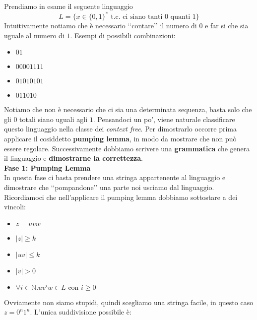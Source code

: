 \documentclass[a4paper,oneside]{scrbook}
\begin{document}
Prendiamo in esame il seguente linguaggio 
$$L=\{x\in\{0,1\}^*\text{ t.c. ci siano tanti 0 quanti 1}\}$$
Intuitivamente notiamo che è necessario ‘‘contare’’ il numero di $0$ e far si che sia uguale al numero di $1$. Esempi di possibili combinazioni:
\begin{itemize}
	\item $01$
	\item $00001111$
	\item $01010101$
	\item $011010$
\end{itemize}
Notiamo che non è necessario che ci sia una determinata sequenza, basta solo che gli $0$ totali siano uguali agli $1$.
Pensandoci un po', viene naturale classificare questo linguaggio nella classe dei \textit{context free}.
Per dimostrarlo occorre prima applicare il cosiddetto \textbf{pumping lemma}, in modo da mostrare che non può essere regolare.
Successivamente dobbiamo scrivere una \textbf{grammatica} che genera il linguaggio e \textbf{dimostrarne la correttezza}.\\
\textbf{Fase 1: Pumping Lemma}\\
In questa fase ci basta prendere una stringa appartenente al linguaggio e dimostrare che ‘‘pompandone’’ una parte noi usciamo dal linguaggio.
Ricordiamoci che nell'applicare il pumping lemma dobbiamo sottostare a dei vincoli:
\begin{itemize}
	\item $z=uvw$
	\item $|z|\geq k$
	\item $|uv|\leq k$
	\item $|v|>0$
	\item $\forall i \in \mathbb{N}.uv^iw\in L \text{ con }i\geq0$
\end{itemize}
Ovviamente non siamo stupidi, quindi scegliamo una stringa facile, in questo caso $z=0^n1^n$.
L'unica suddivisione possibile è:
\begin{center}
\end{center}
\end{document}
